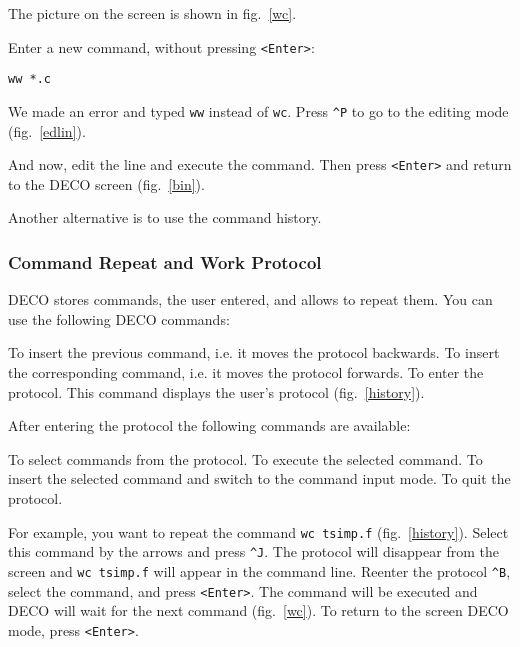 The picture on the screen is shown in fig.~\ref{wc}.


Enter a new command, without pressing {\tt <Enter>}:
\begin{source}
\begin{verbatim}
ww *.c
\end{verbatim}
\end{source}
We made an error and typed {\tt ww} instead of {\tt wc}. Press
{\tt \^{}P} to go to the editing mode (fig.~\ref{edlin}).


And now, edit the line and execute the command. Then 
press {\tt <Enter>} and return to the DECO screen (fig.~\ref{bin}).

Another alternative is to use the command history.

\subsubsection{Command Repeat and Work Protocol}

DECO stores commands, the user entered, and allows 
to repeat them. You can use the following DECO commands:

\begin{example}
To insert the previous command, i.e. it moves the protocol backwards.
To insert the corresponding command, i.e. it moves the protocol forwards.
To enter the protocol. This command displays the user's
protocol (fig.~\ref{history}).
\end{example}
 

After entering the protocol the following commands are available:
\begin{example}
\litem{$\uparrow$, $\downarrow$}
To select commands from the protocol.
To execute the selected command.
To insert the selected command and switch to the command input mode.
To quit the protocol.
\end{example}

For example, you want to repeat the command {\tt wc tsimp.f}
(fig.~\ref{history}). Select this command by the arrows and
press {\tt \^{}J}. The protocol will disappear from the screen
and {\tt wc tsimp.f} will appear in the command line.
Reenter the protocol {\tt \^{}B}, select the command, and
press {\tt <Enter>}. The command will be executed and
DECO will wait for the next command (fig.~\ref{wc}). To return
to the screen DECO mode, press {\tt <Enter>}.

